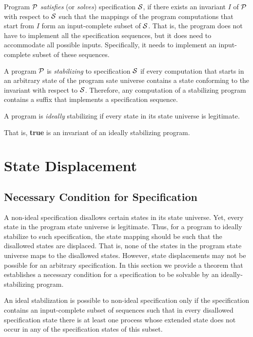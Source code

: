 \documentclass[11pt]{llncs}
\def\PROG#1{${\cal #1}$}
\begin{document}
Program \PROG{P} \emph{satisfies} (or \emph{solves}) specification
\PROG{S}, if there exists an invariant $I$ of \PROG{P} with respect to
\PROG{S} such that the mappings of the program computations that start
from $I$ form an input-complete subset of \PROG{S}. That is, the
program does not have to implement all the specification sequences,
but it does need to accommodate all possible inputs. Specifically, it
needs to implement an input-complete subset of these sequences.


A program \PROG{P} is \emph{stabilizing} to specification \PROG{S} if
every computation that starts in an arbitrary state of the program
sate universe contains a state conforming to the invariant with
respect to \PROG{S}. Therefore, any computation of a stabilizing
program contains a suffix that implements a specification sequence.

\begin{definition}
A program is \emph{ideally} stabilizing if every state in its state
universe is legitimate.
\end{definition}

That is, \textbf{true} is an invariant of an ideally stabilizing
program.

\section{State Displacement}\label{SecNonIdealSpec}

\subsection{Necessary Condition for Specification}

A non-ideal specification disallows certain states in its state
universe. Yet, every state in the program state universe is
legitimate. Thus, for a program to ideally stabilize to such
specification, the state mapping should be such that the disallowed
states are displaced. That is, none of the states in the program state
universe maps to the disallowed states. However, state displacements
may not be possible for an arbitrary specification. In this section we
provide a theorem that establishes a necessary condition for a
specification to be solvable by an ideally-stabilizing program.

\begin{theorem}\label{trmNoIdeal}
An ideal stabilization is possible to non-ideal specification only if
the specification contains an input-complete subset of sequences such
that in every disallowed specification state there is at least one
process whose extended state does not occur in any of the
specification states of this subset.
\end{theorem}
\end{document}
